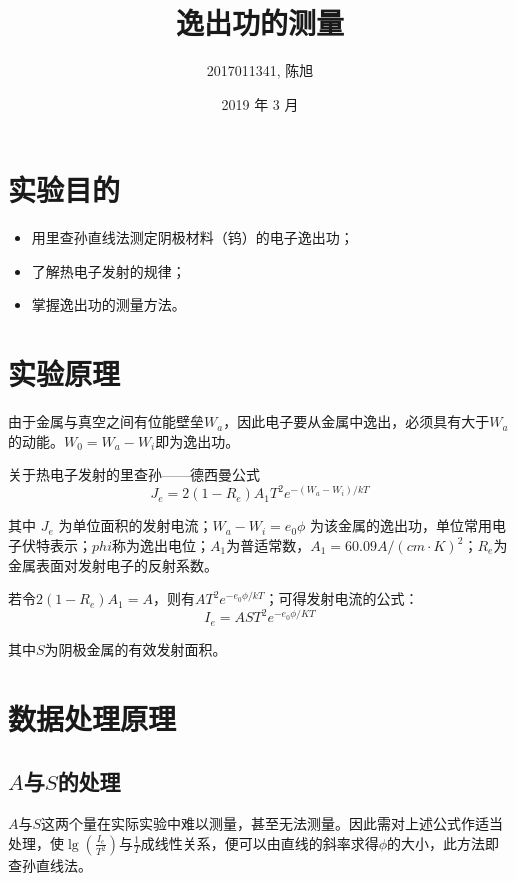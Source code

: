\documentclass[a4paper]{article}
\title{逸出功的测量}
\author{2017011341, 陈旭}
\date{2019 年 3 月}
\begin{document}
\maketitle



\section{实验目的}

\begin{itemize}
	\item 用里查孙直线法测定阴极材料（钨）的电子逸出功；
	\item 了解热电子发射的规律；
	\item 掌握逸出功的测量方法。
\end{itemize}

\section{实验原理}

\par 由于金属与真空之间有位能壁垒$W_a$，因此电子要从金属中逸出，必须具有大于$W_a$的动能。$W_0=W_a-W_i$即为逸出功。

\par 关于热电子发射的里查孙——德西曼公式
$$J_e=2(1-R_e)A_1T^2e^{-(W_a-W_i)/kT}$$
\par 其中 $J_e$ 为单位面积的发射电流；$W_a-W_i=e_0 \phi$ 为该金属的逸出功，单位常用电子伏特表示；$phi$称为逸出电位；$A_1$为普适常数，$A_1=60.09A/(cm\cdot K)^2$；$R_e$为金属表面对发射电子的反射系数。

\par 若令$2(1-R_e)A_1=A$，则有$AT^2e^{-e_0\phi/kT}$；可得发射电流的公式：
$$I_e=AST^2e^{-e_0\phi/KT}$$
\par 其中$S$为阴极金属的有效发射面积。

\section{数据处理原理}

\subsection{$A$与$S$的处理}

\par $A$与$S$这两个量在实际实验中难以测量，甚至无法测量。因此需对上述公式作适当处理，使$\lg(\frac{I_e}{T^2})$与$\frac{1}{T}$成线性关系，便可以由直线的斜率求得$\phi$的大小，此方法即查孙直线法。
\end{document}
